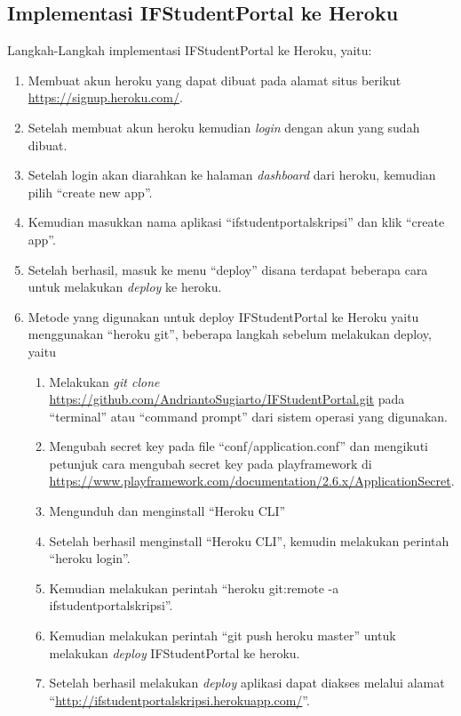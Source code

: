 \subsection{Implementasi IFStudentPortal ke Heroku}
Langkah-Langkah implementasi IFStudentPortal ke Heroku, yaitu:
\begin{enumerate}
	\item Membuat akun heroku yang dapat dibuat pada alamat situs berikut \url{https://signup.heroku.com/}.
	\item Setelah membuat akun heroku kemudian \textit{login} dengan akun yang sudah dibuat.
	\item Setelah login akan diarahkan ke halaman \textit{dashboard} dari heroku, kemudian pilih ``create new app''.
	\item Kemudian masukkan nama aplikasi ``ifstudentportalskripsi'' dan klik ``create app''.
	\item Setelah berhasil, masuk ke menu ``deploy'' disana terdapat beberapa cara untuk melakukan \textit{deploy} ke heroku.
	\item Metode yang digunakan untuk deploy IFStudentPortal ke Heroku yaitu menggunakan ``heroku git'', beberapa langkah sebelum melakukan deploy, yaitu
	\begin{enumerate}
		\item Melakukan \textit{git clone } \url{https://github.com/AndriantoSugiarto/IFStudentPortal.git} pada ``terminal'' atau ``command prompt'' dari sistem operasi yang digunakan.
		\item Mengubah secret key pada file ``conf/application.conf'' dan mengikuti petunjuk cara mengubah secret key pada playframework di \url{https://www.playframework.com/documentation/2.6.x/ApplicationSecret}.
		\item Mengunduh dan menginstall ``Heroku CLI''
		\item Setelah berhasil menginstall ``Heroku CLI'', kemudin melakukan perintah ``heroku login''.
		\item Kemudian melakukan perintah ``heroku git:remote -a ifstudentportalskripsi''.
		\item Kemudian melakukan perintah ``git push heroku master'' untuk melakukan \textit{deploy} IFStudentPortal ke heroku.
		\item Setelah berhasil melakukan \textit{deploy} aplikasi dapat diakses melalui alamat ``\url{http://ifstudentportalskripsi.herokuapp.com/}''.
	\end{enumerate}
\end{enumerate}
